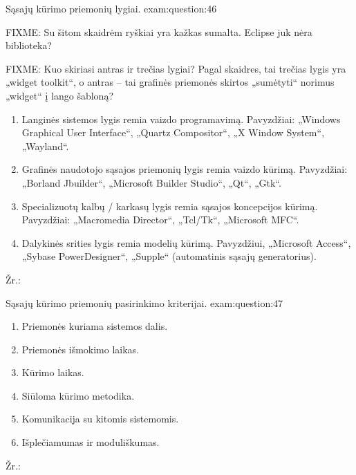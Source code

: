 \begin{question}{%
  Sąsajų kūrimo priemonių lygiai.
  }{exam:question:46}

  FIXME: Su šitom skaidrėm ryškiai yra kažkas sumalta. Eclipse juk nėra 
  biblioteka?

  FIXME: Kuo skiriasi antras ir trečias lygiai? Pagal skaidres, tai
  trečias lygis yra „widget toolkit“, o antras – tai grafinės priemonės
  skirtos „sumėtyti“ norimus „widget“ į lango šabloną?

  \begin{enumerate}
    \item Langinės sistemos lygis remia vaizdo programavimą. Pavyzdžiai:
      „Windows Graphical User Interface“, „Quartz Compositor“,
      „X Window System“, „Wayland“.\cite[20]{skaidres-17}
    \item Grafinės naudotojo sąsajos priemonių lygis remia vaizdo
      kūrimą. Pavyzdžiai: „Borland Jbuilder“, „Microsoft Builder Studio“,
      „Qt“, „Gtk“.
    \item Specializuotų kalbų / karkasų lygis remia sąsajos koncepcijos
      kūrimą. Pavyzdžiai: „Macromedia Director“, „Tcl/Tk“,
      „Microsoft MFC“.
    \item Dalykinės srities lygis remia modelių kūrimą. Pavyzdžiui,
      „Microsoft Access“, „Sybase PowerDesigner“, „Supple“ (automatinis
      sąsajų generatorius).
  \end{enumerate}
  Žr.: \cite[17]{skaidres-17}
\end{question}

\begin{question}{%
  Sąsajų kūrimo priemonių pasirinkimo kriterijai.
  }{exam:question:47}
  \begin{enumerate}
    \item Priemonės kuriama sistemos dalis.
    \item Priemonės išmokimo laikas.
    \item Kūrimo laikas.
    \item Siūloma kūrimo metodika.
    \item Komunikacija su kitomis sistemomis.
    \item Išplečiamumas ir moduliškumas.
  \end{enumerate}
  Žr.: \cite[32]{skaidres-17}
\end{question}
